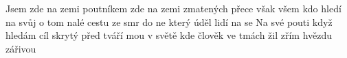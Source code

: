 \begin{TEXT}{Jsem zde na zemi poutníkem}
\SLOKA {}zde na zemi  \NL
{} zmatených   \NL
{}  přece však  všem \NL
kdo hledí na svůj  
\REFREN  {} o tom  nalé \NL
cestu  ze smr do ne  \NL
{}  který    \NL
úděl lidí  na se 
\SLOKA Na své pouti když hledám cíl \NL
skrytý před tváří mou \NL
v světě kde člověk ve tmách žil \NL
zřím hvězdu zářivou \NL
\end{TEXT}
